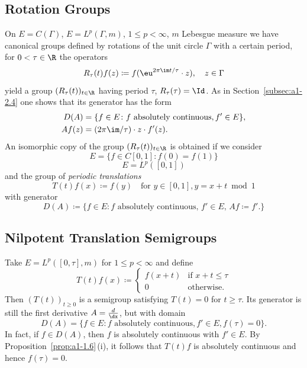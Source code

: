\subsection{Rotation Groups}\label{subsec:a1-2.5}%
On $E = C(\Gamma)$, \resp $E = L^{p}(\Gamma,m)$, $1 \leq p < \infty$, $m$ Lebesgue measure we have canonical groups defined by rotations of the unit circle $\Gamma$ with a certain period, \ie for $0 < \tau \in \R$ the operators
\[
    R_{\tau}(t)f(z) \coloneqq f( \eu^{2\pi \im t/\tau}\cdot z), \quad z \in \Gamma
\]
yield a group $(R_{\tau}(t))_{t \in \R}$ having period $\tau$, \ie $R_{\tau}(\tau) = \Id$.
As in Section~\ref{subsec:a1-2.4} one shows that its generator has the form
\begin{align*}
    D(A) &= \{f \in E \colon f \text{ absolutely continuous}, f' \in E\}, \\
    Af(z)&= (2\pi \im/\tau) \cdot z \cdot f'(z).
\end{align*}
An isomorphic copy of the group $(R_{\tau}(t))_{t \in \R}$ is obtained if we consider 
\[
E = \{f \in C\left[ 0,1 \right] \colon f(0) = f(1)\}
\]
\resp 
\[
E = L^{p}(\left[ 0,1 \right])
\]
and the group of \emph{periodic translations}
\[
    T(t)f(x) \coloneqq f(y) \quad \text{for $y \in \left[ 0,1 \right], y = x+t \bmod 1$} 
\]
with generator
\[
    D(A) \coloneqq \{f \in E \colon f \text{ absolutely continuous, $f' \in E$, $Af \coloneqq f'$}. \}
\]
\subsection{Nilpotent Translation Semigroups}\label{subsec:a1-2.6}%
Take $E = L^{p}([0,\tau],m)$ for $1 \leq p < \infty$ and define
\[
    T(t)f(x) \coloneqq \begin{cases}
        f(x+t) & \text{if } x+t \leq \tau \\
        0 & \text{otherwise.}
    \end{cases}
\]
Then $(T(t))_{t\geq 0}$ is a semigroup satisfying $T(t) = 0$ for $t \geq \tau$.
Its generator is still the first derivative $A = \frac{d}{\dx}$, but with domain 
\[
D(A) = \{f \in E \colon f \text{ absolutely continuous}, f' \in E, f(\tau) = 0\}.
\]
In fact, if\/ $f \in D(A)$, then $f$ is absolutely continuous with $f' \in E$.
By Proposition~\ref{prop:a1-1.6}\,(i), it follows that $T(t)f$ is absolutely continuous and hence $f(\tau) = 0$.
